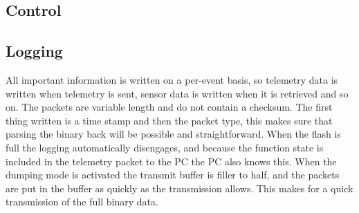\documentclass[final]{article}
\begin{document}
\subsection{Control}

\subsection{Logging}
All important information is written on a per-event basis, so telemetry data is written when telemetry is sent, sensor data is written when it is retrieved and so on.
The packets are variable length and do not contain a checksum.
The first thing written is a time stamp and then the packet type, this makes sure that parsing the binary back will be possible and straightforward.
When the flash is full the logging automatically disengages, and because the function state is included in the telemetry packet to the PC the PC also knows this.
When the dumping mode is activated the transmit buffer is filler to half, and the packets are put in the buffer as quickly as the transmission allows.
This makes for a quick transmission of the full binary data.
\end{document}
